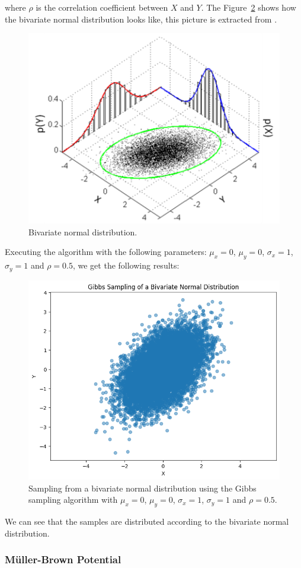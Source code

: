 \documentclass{article}
\begin{document}
where $\rho$ is the correlation coefficient between $X$ and $Y$. The Figure~\ref{fig:bivariatenormal} shows how the bivariate normal distribution looks like, this picture is extracted from \cite{wiki:bivariatenormal}.

\begin{figure}[H]
	\centering
	\includegraphics[width=0.5\linewidth]{./Figures/MCMC/MultivariateNormal-2.png}
	\caption{Bivariate normal distribution.}
	\label{fig:bivariatenormal}
\end{figure}

Executing the algorithm with the following parameters: $\mu_x = 0$, $\mu_y = 0$, $\sigma_x = 1$, $\sigma_y = 1$ and $\rho = 0.5$, we get the following results:

\begin{figure}[H]
	\centering
	\includegraphics[width=0.5\linewidth]{./Figures/MCMC/bivariates.png}
	\caption{Sampling from a bivariate normal distribution using the Gibbs sampling algorithm with $\mu_x = 0$, $\mu_y = 0$, $\sigma_x = 1$, $\sigma_y = 1$ and $\rho = 0.5$.}
	\label{fig:bivariatenormal}
\end{figure}

We can see that the samples are distributed according to the bivariate normal distribution.


\subsubsection{Müller-Brown Potential}
\end{document}
